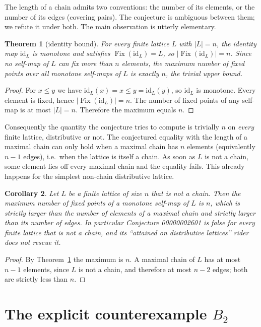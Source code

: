\documentclass[11pt]{article}
\newtheorem{theorem}{Theorem}
\newtheorem{corollary}[theorem]{Corollary}
\theoremstyle{definition}
\newcommand{\Fix}{\operatorname{Fix}}
\newcommand{\id}{\mathrm{id}}
\begin{document}
The length of a chain admits two conventions: the number of its elements, or
the number of its edges (covering pairs). The conjecture is ambiguous between
them; we refute it under both. The main observation is utterly elementary.

\begin{theorem}[identity bound]
\label{thm:identity}
For every finite lattice $L$ with $|L| = n$, the identity map $\id_L$ is
monotone and satisfies $\Fix(\id_L) = L$, so $|\Fix(\id_L)| = n$. Since no
self-map of $L$ can fix more than $n$ elements, the maximum number of fixed
points over all monotone self-maps of $L$ is exactly $n$, the trivial upper
bound.
\end{theorem}

\begin{proof}
For $x \le y$ we have $\id_L(x) = x \le y = \id_L(y)$, so $\id_L$ is monotone.
Every element is fixed, hence $|\Fix(\id_L)| = n$. The number of fixed points
of any self-map is at most $|L| = n$. Therefore the maximum equals $n$.
\end{proof}

Consequently the quantity the conjecture tries to compute is trivially $n$ on
\emph{every} finite lattice, distributive or not. The conjectured equality
with the length of a maximal chain can only hold when a maximal chain has $n$
elements (equivalently $n-1$ edges), i.e.\ when the lattice is itself a chain.
As soon as $L$ is not a chain, some element lies off every maximal chain and
the equality fails. This already happens for the simplest non-chain
distributive lattice.

\begin{corollary}
\label{cor:general}
Let $L$ be a finite lattice of size $n$ that is not a chain. Then the maximum
number of fixed points of a monotone self-map of $L$ is $n$, which is strictly
larger than the number of elements of a maximal chain and strictly larger than
its number of edges. In particular Conjecture 00000002601 is false for every
finite lattice that is not a chain, and its ``attained on distributive
lattices'' rider does not rescue it.
\end{corollary}

\begin{proof}
By Theorem~\ref{thm:identity} the maximum is $n$. A maximal chain of $L$ has
at most $n-1$ elements, since $L$ is not a chain, and therefore at most $n-2$
edges; both are strictly less than $n$.
\end{proof}

\section{The explicit counterexample $B_2$}
\end{document}

